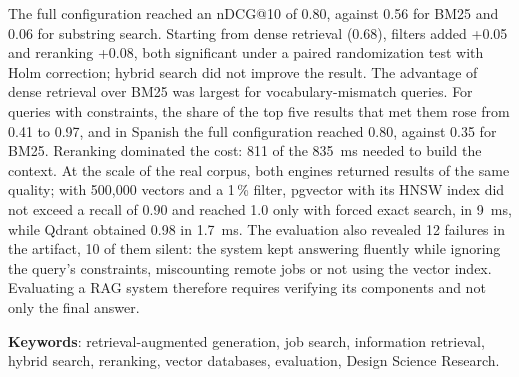 The full configuration reached an nDCG@10 of 0.80, against 0.56 for BM25 and 0.06 for substring search. Starting from dense retrieval (0.68), filters added +0.05 and reranking +0.08, both significant under a paired randomization test with Holm correction; hybrid search did not improve the result. The advantage of dense retrieval over BM25 was largest for vocabulary-mismatch queries. For queries with constraints, the share of the top five results that met them rose from 0.41 to 0.97, and in Spanish the full configuration reached 0.80, against 0.35 for BM25. Reranking dominated the cost: 811 of the 835~ms needed to build the context. At the scale of the real corpus, both engines returned results of the same quality; with 500,000 vectors and a 1\,\% filter, pgvector with its HNSW index did not exceed a recall of 0.90 and reached 1.0 only with forced exact search, in 9~ms, while Qdrant obtained 0.98 in 1.7~ms. The evaluation also revealed 12 failures in the artifact, 10 of them silent: the system kept answering fluently while ignoring the query's constraints, miscounting remote jobs or not using the vector index. Evaluating a RAG system therefore requires verifying its components and not only the final answer.

\textbf{Keywords}: retrieval-augmented generation, job search, information retrieval, hybrid search, reranking, vector databases, evaluation, Design Science Research.
